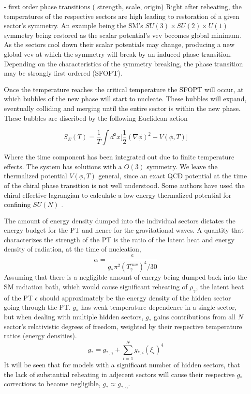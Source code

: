 \documentclass[nofootinbib,twocolumn,preprintnumbers]{revtex4-1}
\begin{document}
\vspace{1em }
- first order phase transitions ( strength, scale, origin)
Right after reheating, the temperatures of the respective sectors are high leading to restoration of a given sector's symmetry.  An example being the SM's $SU(3) \times SU(2) \times U(1)$ symmetry being restored as the scalar potential's vev becomes global minimum. As the sectors cool down their scalar potentials may change, producing a new global vev at which the symmetry will break by an induced phase transition. Depending on the characteristics of the symmetry breaking, the phase transition may be strongly first ordered (SFOPT).  

Once the temperature reaches the critical temperature the SFOPT will occur, at which bubbles of the new phase will start to nucleate. These bubbles will expand, eventually colliding and merging until the entire sector is within the new phase.  These bubbles are discribed by the following Euclidean action

\begin{equation}
S_{E}(T) = \frac{1}{T}\int d^3x \bigg[\frac{1}{2}(\nabla\phi)^2 + V(\phi,T)  \bigg]
\end{equation}

Where the time component has been integrated out due to finite temperature effects. The system has solutions with a $O(3)$ symmetry. We leave the thermalized potential $V(\phi, T)$ general, since an exact QCD potential at the time of the chiral phase transition is not well understood. Some authors have used the chiral effective lagrangian to calculate a low energy thermalized potential for confining $SU(N)$ .

The amount of energy density dumped into the individual sectors dictates the energy budget for the PT and hence for the gravitational waves.  A quantity that characterizes the strength of the PT is the ratio of the latent heat and energy density of radiation, at the time of nucleation, 
\begin{equation}
\alpha = \frac{\epsilon}{g_{*} \pi^2 (T^{nuc}_{\gamma})^4/30}
\end{equation}
 Assuming that there is a negligible amount of energy being dumped back into the SM radiation bath, which would cause significant reheating of $\rho_{\gamma}$, the latent heat of the PT $\epsilon$ should  approximately be the energy density of the hidden sector going through the PT. $g_{*}$ has weak temperature dependence in a single sector, but when dealing with multiple hidden sectors, $g_{*}$ gains contributions from all $N$ sector's relativistic degrees of freedom, weighted by their respective temperature ratios (energy densities).
\begin{equation}
g_{*} = g_{*,\gamma} + \sum_{i = 1}^{N} g_{*,i} (\xi_{i})^4
\end{equation}
It will be seen that for models with a significant number of hidden sectors, that the lack of substantial reheating in adjecent sectors will cause their respective $g_{*}$ corrections to become negligible, $g_{*} \approx g_{*,\gamma}$.
\end{document}
